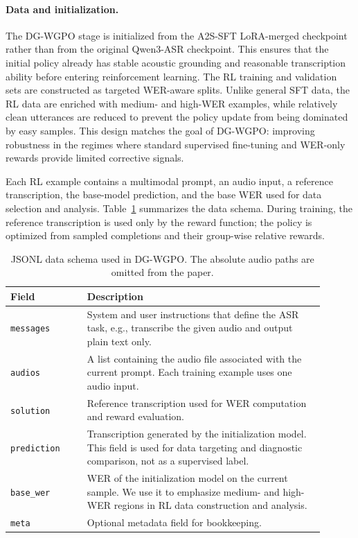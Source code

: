 \documentclass{article}
\begin{document}
\paragraph{Data and initialization.}
The DG-WGPO stage is initialized from the A2S-SFT LoRA-merged checkpoint rather
than from the original Qwen3-ASR checkpoint. This ensures that the initial policy
already has stable acoustic grounding and reasonable transcription ability before
entering reinforcement learning. The RL training and validation sets are
constructed as targeted WER-aware splits. Unlike general SFT data, the RL data are
enriched with medium- and high-WER examples, while relatively clean utterances are
reduced to prevent the policy update from being dominated by easy samples. This
design matches the goal of DG-WGPO: improving robustness in the regimes where
standard supervised fine-tuning and WER-only rewards provide limited corrective
signals.

Each RL example contains a multimodal prompt, an audio input, a reference
transcription, the base-model prediction, and the base WER used for data
selection and analysis. Table~\ref{tab:dg_wgpo_data_schema} summarizes the data
schema. During training, the reference transcription is used only by the reward
function; the policy is optimized from sampled completions and their group-wise
relative rewards.

\begin{table}[t]
\centering
\small
\caption{
JSONL data schema used in DG-WGPO. The absolute audio paths are omitted from the
paper.
}
\label{tab:dg_wgpo_data_schema}
\begin{tabular}{p{0.22\linewidth} p{0.68\linewidth}}
\toprule
\textbf{Field} & \textbf{Description} \\
\midrule
\texttt{messages}
& System and user instructions that define the ASR task, e.g., transcribe the
given audio and output plain text only. \\

\texttt{audios}
& A list containing the audio file associated with the current prompt. Each
training example uses one audio input. \\

\texttt{solution}
& Reference transcription used for WER computation and reward evaluation. \\

\texttt{prediction}
& Transcription generated by the initialization model. This field is used for
data targeting and diagnostic comparison, not as a supervised label. \\

\texttt{base\_wer}
& WER of the initialization model on the current sample. We use it to emphasize
medium- and high-WER regions in RL data construction and analysis. \\

\texttt{meta}
& Optional metadata field for bookkeeping. \\
\bottomrule
\end{tabular}
\vspace{-2mm}
\end{table}
\end{document}

